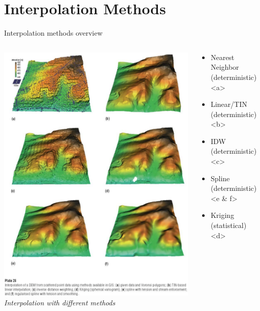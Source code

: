 
\section{Interpolation Methods}
\begin{frame}{Interpolation methods overview}
	\begin{columns}[c] %
		\begin{column}{.5\textwidth}
			\centering
			\includegraphics[trim=0 100 0 0,clip,height=.75\textheight]{../writeup/images/dem.png}\\
			\textit{\footnotesize Interpolation with different methods \cite{mitas_spatial_1999}}
		\end{column}%
		\hfill%
		\begin{column}{.5\textwidth}
			\begin{itemize}
				\item Nearest Neighbor (deterministic) <a>
				\item Linear/TIN (deterministic) <b>
				\item IDW (deterministic) <c>
				\item Spline (deterministic) <e \& f>
				\item Kriging (statistical) <d>
			\end{itemize}
		\end{column}%
	\end{columns}\end{frame}
